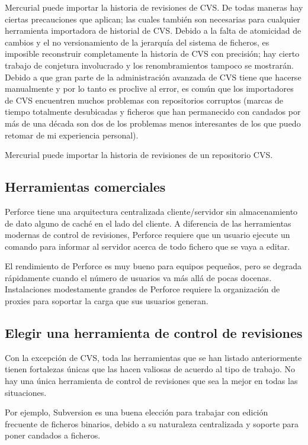 Mercurial puede importar la historia de revisiones de CVS.  De todas
maneras hay ciertas precauciones que aplican; las cuales también son
necesarias para cualquier herramienta importadora de historial de
CVS. Debido a la falta de atomicidad de cambios y el no versionamiento
de la jerarquía del sistema de ficheros, es imposible reconstruir
completamente la historia de CVS con precisión; hay cierto trabajo de
conjetura involucrado y los renombramientos tampoco se
mostrarán. Debido a que gran parte de la administración avanzada de
CVS tiene que hacerse manualmente y por lo tanto es proclive al error,
es común que los importadores de CVS encuentren muchos problemas con
repositorios corruptos (marcas de tiempo totalmente desubicadas y
ficheros que han permanecido con candados por más de una década son
dos de los problemas menos interesantes de los que puedo retomar de mi
experiencia personal).

Mercurial puede importar la historia de revisiones de un repositorio
CVS.

\subsection{Herramientas comerciales}

Perforce tiene una arquitectura centralizada cliente/servidor sin
almacenamiento de dato alguno de caché en el lado del cliente. A diferencia de
las herramientas modernas de control de revisiones, Perforce requiere
que un usuario ejecute un comando para informar al servidor acerca de
todo fichero que se vaya a editar.

El rendimiento de Perforce es muy bueno para equipos pequeños, pero se
degrada rápidamente cuando el número de usuarios va más allá de pocas
docenas. Instalaciones modestamente grandes de Perforce requiere la
organización de proxies para soportar la carga que sus usuarios generan.

\subsection{Elegir una herramienta de control de revisiones}

Con la excepción de CVS, toda las herramientas que se han listado
anteriormente tienen fortalezas únicas que las hacen valiosas de acuerdo al
tipo de trabajo. No hay una única herramienta de control de revisiones
que sea la mejor en todas las situaciones.

Por ejemplo, Subversion es una buena elección para trabajar con
edición frecuente de ficheros binarios, debido a su naturaleza
centralizada y soporte para poner candados a ficheros.

